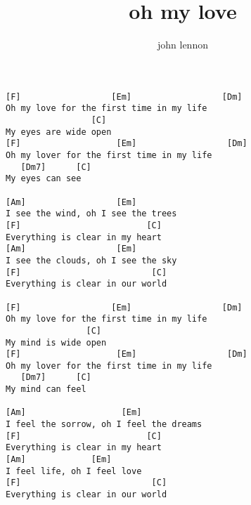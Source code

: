 \author{john lennon}
\title{oh my love}
\maketitle
\begin{verbatim}
[F]                  [Em]                  [Dm]
Oh my love for the first time in my life
                 [C]
My eyes are wide open
[F]                   [Em]                  [Dm]
Oh my lover for the first time in my life
   [Dm7]      [C]
My eyes can see 

[Am]                  [Em]
I see the wind, oh I see the trees
[F]                         [C]
Everything is clear in my heart
[Am]                  [Em]
I see the clouds, oh I see the sky
[F]                          [C]
Everything is clear in our world 

[F]                  [Em]                  [Dm]
Oh my love for the first time in my life
                [C]
My mind is wide open
[F]                   [Em]                  [Dm]
Oh my lover for the first time in my life
   [Dm7]      [C]
My mind can feel 

[Am]                   [Em]
I feel the sorrow, oh I feel the dreams
[F]                         [C]                          
Everything is clear in my heart
[Am]             [Em]
I feel life, oh I feel love
[F]                          [C]
Everything is clear in our world
\end{verbatim}